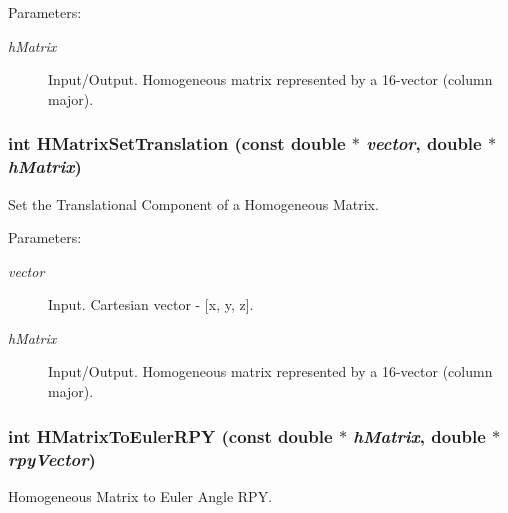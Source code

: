 \begin{Desc}
\item[Parameters:]
\begin{description}
\item[{\em hMatrix}]Input/Output. Homogeneous matrix represented by a 16-vector (column major). \end{description}
\end{Desc}
\hypertarget{group__homogeneous_gac5515e14e14afacf5cf678705c499f0}{
\subsubsection[HMatrixSetTranslation]{\setlength{\rightskip}{0pt plus 5cm}int HMatrixSetTranslation (const double $\ast$ {\em vector}, \/  double $\ast$ {\em hMatrix})}}
\label{group__homogeneous_gac5515e14e14afacf5cf678705c499f0}


Set the Translational Component of a Homogeneous Matrix. 

\begin{Desc}
\item[Parameters:]
\begin{description}
\item[{\em vector}]Input. Cartesian vector - \mbox{[}x, y, z\mbox{]}. \item[{\em hMatrix}]Input/Output. Homogeneous matrix represented by a 16-vector (column major). \end{description}
\end{Desc}
\hypertarget{group__homogeneous_g1331c182a0156371f53bbe26f721c8fa}{
\subsubsection[HMatrixToEulerRPY]{\setlength{\rightskip}{0pt plus 5cm}int HMatrixToEulerRPY (const double $\ast$ {\em hMatrix}, \/  double $\ast$ {\em rpyVector})}}
\label{group__homogeneous_g1331c182a0156371f53bbe26f721c8fa}


Homogeneous Matrix to Euler Angle RPY. 

